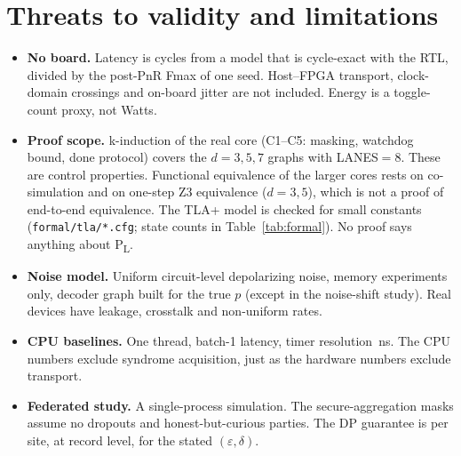\documentclass[10pt]{article}
\begin{document}


\section{Threats to validity and limitations}\label{sec:limits}
\begin{itemize}
\item \textbf{No board.} Latency is cycles from a model that is cycle-exact with the RTL, divided by the
  post-PnR Fmax of one seed. Host--FPGA transport, clock-domain crossings and on-board jitter are not
  included. Energy is a toggle-count proxy, not Watts.
\item \textbf{Proof scope.} k-induction of the real core (C1--C5: masking, watchdog bound, done protocol) covers
  the $d=3,5,7$ graphs with LANES$=8$. These are control properties. Functional equivalence of the larger cores
  rests on co-simulation and on one-step Z3 equivalence ($d=3,5$), which is not a proof of end-to-end equivalence.
  The TLA+ model is checked for small constants (\texttt{formal/tla/*.cfg}; state counts in Table~\ref{tab:formal}).
  No proof says anything about P\textsubscript{L}.
\item \textbf{Noise model.} Uniform circuit-level depolarizing noise, memory experiments only, decoder
  graph built for the true $p$ (except in the noise-shift study). Real devices have leakage, crosstalk and
  non-uniform rates.
\item \textbf{CPU baselines.} One thread, batch-1 latency, timer resolution \,ns. The
  CPU numbers exclude syndrome acquisition, just as the hardware numbers exclude transport.
\item \textbf{Federated study.} A single-process simulation. The secure-aggregation masks assume no dropouts and
  honest-but-curious parties. The DP guarantee is per site, at record level, for the stated $(\varepsilon,\delta)$.
\end{itemize}
\end{document}
